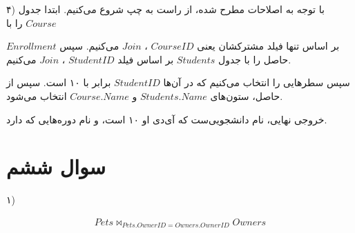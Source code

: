 \bigbreak

۴) با توجه به اصلاحات مطرح شده، از راست به چپ شروع می‌کنیم.
ابتدا جدول
$Course$
را با

$Enrollment$
بر اساس تنها فیلد مشترکشان یعنی
$CourseID$
،
$Join$
می‌کنیم. سپس حاصل را با جدول
$Students$
بر اساس فیلد
$StudentID$
،
$Join$
می‌کنیم.

سپس سطرهایی را انتخاب می‌کنیم که در آن‌ها
$StudentID$
برابر با ۱۰ است.
سپس از حاصل، ستون‌های
$Students.Name$
و
$Course.Name$
انتخاب می‌شود.

خروجی نهایی، نام دانشجویی‌ست که آی‌دی او ۱۰ است، و نام دوره‌هایی که دارد.

\bigbreak

\begin{LTRbibitems}
\end{LTRbibitems}



\section*{\centering سوال ششم}

۱)

\begin{LTRbibitems}
    \begin{gather*}
        Pets \bowtie_{Pets.OwnerID = Owners.OwnerID} Owners
        \\
    \end{gather*}
\end{LTRbibitems}


